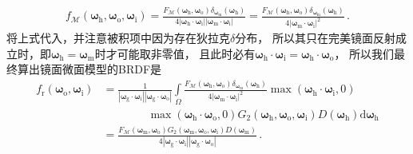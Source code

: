 \begin{align}
    f_{\mathcal{M}}({\bm\omega}_{\mathrm{h}},{\bm\omega}_{\mathrm{o}},{\bm\omega}_{\mathrm{i}})
    =\frac{F_{\mathcal{M}}({\bm\omega}_{\mathrm{h}},{\bm\omega}_{\mathrm{o}})
    \delta_{{\bm\omega}_{\mathrm{m}}}({\bm\omega}_{\mathrm{h}})}
    {4|{\bm\omega}_{\mathrm{h}}\cdot{\bm\omega}_{\mathrm{i}}|
    |{\bm\omega}_{\mathrm{m}}\cdot{\bm\omega}_{\mathrm{i}}|}
    =\frac{F_{\mathcal{M}}({\bm\omega}_{\mathrm{h}},{\bm\omega}_{\mathrm{o}})
    \delta_{{\bm\omega}_{\mathrm{m}}}({\bm\omega}_{\mathrm{h}})}
    {4|{\bm\omega}_{\mathrm{m}}\cdot{\bm\omega}_{\mathrm{i}}|^2}\, .
\end{align}
将上式代入，并注意被积项中因为存在狄拉克$\delta$分布，
所以其只在完美镜面反射成立时，即${\bm\omega}_{\mathrm{h}}={\bm\omega}_{\mathrm{m}}$时才可能取非零值，
且此时必有${\bm\omega}_{\mathrm{h}}\cdot{\bm\omega}_{\mathrm{i}}={\bm\omega}_{\mathrm{h}}\cdot{\bm\omega}_{\mathrm{o}}$，
所以我们最终算出镜面微面模型的BRDF是
\begin{align}\label{eq:08ex01-BRDFMicrofacetFinal}
    f_{\mathrm{r}}({\bm\omega}_{\mathrm{o}},{\bm\omega}_{\mathrm{i}})
     & =\frac{1}{|{\bm\omega}_{\mathrm{g}}\cdot{\bm\omega}_{\mathrm{i}}||{\bm\omega}_{\mathrm{g}}\cdot{\bm\omega}_{\mathrm{o}}|}
    \int\limits_{\varOmega}\frac{F_{\mathcal{M}}({\bm\omega}_{\mathrm{h}},{\bm\omega}_{\mathrm{o}})
    \delta_{{\bm\omega}_{\mathrm{m}}}({\bm\omega}_{\mathrm{h}})}
    {4|{\bm\omega}_{\mathrm{m}}\cdot{\bm\omega}_{\mathrm{i}}|^2}
    \max({\bm\omega}_{\mathrm{h}}\cdot{\bm\omega}_{\mathrm{i}},0)\nonumber                                                       \\
     & \qquad\qquad\max({\bm\omega}_{\mathrm{h}}\cdot{\bm\omega}_{\mathrm{o}},0)
    G_2({\bm\omega}_{\mathrm{h}},{\bm\omega}_{\mathrm{o}},{\bm\omega}_{\mathrm{i}})
    D({\bm\omega}_{\mathrm{h}})\mathrm{d}{\bm\omega}_{\mathrm{h}}\nonumber                                                       \\
     & =\frac{F_{\mathcal{M}}({\bm\omega}_{\mathrm{m}},{\bm\omega}_{\mathrm{o}})
    G_2({\bm\omega}_{\mathrm{m}},{\bm\omega}_{\mathrm{o}},{\bm\omega}_{\mathrm{i}})D({\bm\omega}_{\mathrm{m}})}
    {4|{\bm\omega}_{\mathrm{g}}\cdot{\bm\omega}_{\mathrm{i}}||{\bm\omega}_{\mathrm{g}}\cdot{\bm\omega}_{\mathrm{o}}|}\, .
\end{align}

